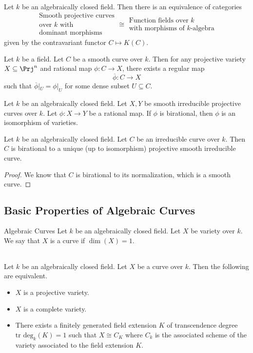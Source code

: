 \documentclass[a4paper]{article}
\begin{document}
\begin{prp}{}{}\\
Let $k$ be an algebraically closed field. Then there is an equivalence of categories $$\substack{\text{Smooth projective curves}\\\text{over }k\text{ with}\\\text{dominant morphisms}}\cong\substack{\text{Function fields over }k\\\text{with morphisms of }k\text{-algebra}}$$ given by the contravariant functor $C\mapsto K(C)$. 
\end{prp}

\begin{prp}{}{} Let $k$ be a field. Let $C$ be a smooth curve over $k$. Then for any projective variety $X\subseteq\Prj^n$ and rational map $\phi:C\to X$, there exists a regular map $$\overline{\phi}:C\to X$$ such that $\overline{\phi}|_U=\phi|_U$ for some dense subset $U\subseteq C$. 
\end{prp}

\begin{prp}{}{} Let $k$ be an algebraically closed field. Let $X,Y$ be smooth irreducible projective curves over $k$. Let $\phi:X\to Y$ be a rational map. If $\phi$ is birational, then $\phi$ is an isomorphism of varieties. 
\end{prp}

\begin{thm}{}{} Let $k$ be an algebraically closed field. Let $C$ be an irreducible curve over $k$. Then $C$ is birational to a unique (up to isomorphism) projective smooth irreducible curve. 
\begin{proof}
We know that $C$ is birational to its normalization, which is a smooth curve. 
\end{proof}
\end{thm}

\subsection{Basic Properties of Algebraic Curves}
\begin{defn}{Algebraic Curves}{} Let $k$ be an algebraically closed field. Let $X$ be variety over $k$. We say that $X$ is a curve if $\dim(X)=1$. 
\end{defn}

\begin{prp}{}{}\\
Let $k$ be an algebraically closed field. Let $X$ be a curve over $k$. Then the following are equivalent. 
\begin{itemize}
\item $X$ is a projective variety. 
\item $X$ is a complete variety. 
\item There exists a finitely generated field extension $K$ of transcendence degree $\text{tr deg}_k(K)=1$ such that $X\cong C_K$ where $C_k$ is the associated scheme of the variety associated to the field extension $K$. 
\end{itemize}
\end{prp}
\end{document}
